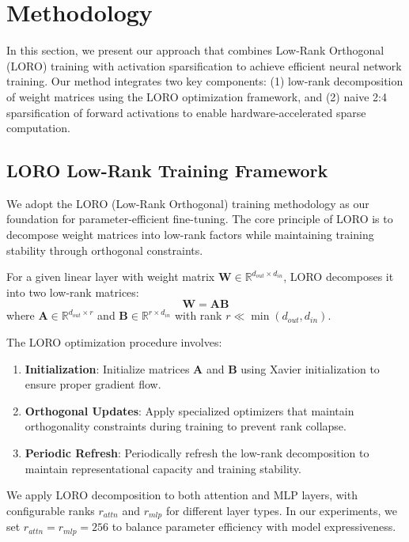 \section{Methodology}

In this section, we present our approach that combines Low-Rank Orthogonal (LORO) training with activation sparsification to achieve efficient neural network training. Our method integrates two key components: (1) low-rank decomposition of weight matrices using the LORO optimization framework, and (2) naive 2:4 sparsification of forward activations to enable hardware-accelerated sparse computation.

\subsection{LORO Low-Rank Training Framework}

We adopt the LORO (Low-Rank Orthogonal) training methodology as our foundation for parameter-efficient fine-tuning. The core principle of LORO is to decompose weight matrices into low-rank factors while maintaining training stability through orthogonal constraints.

For a given linear layer with weight matrix $\mathbf{W} \in \mathbb{R}^{d_{out} \times d_{in}}$, LORO decomposes it into two low-rank matrices:
\begin{equation}
\mathbf{W} = \mathbf{A}\mathbf{B}
\end{equation}
where $\mathbf{A} \in \mathbb{R}^{d_{out} \times r}$ and $\mathbf{B} \in \mathbb{R}^{r \times d_{in}}$ with rank $r \ll \min(d_{out}, d_{in})$.

The LORO optimization procedure involves:
\begin{enumerate}
\item \textbf{Initialization}: Initialize matrices $\mathbf{A}$ and $\mathbf{B}$ using Xavier initialization to ensure proper gradient flow.
\item \textbf{Orthogonal Updates}: Apply specialized optimizers that maintain orthogonality constraints during training to prevent rank collapse.
\item \textbf{Periodic Refresh}: Periodically refresh the low-rank decomposition to maintain representational capacity and training stability.
\end{enumerate}

We apply LORO decomposition to both attention and MLP layers, with configurable ranks $r_{attn}$ and $r_{mlp}$ for different layer types. In our experiments, we set $r_{attn} = r_{mlp} = 256$ to balance parameter efficiency with model expressiveness.

